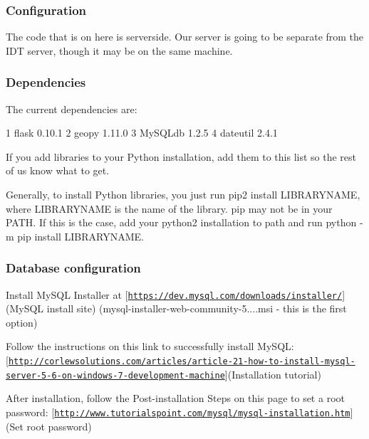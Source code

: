 \subsubsection*{Configuration}

The code that is on here is serverside. Our server is going to be separate from the I\+DT server, though it may be on the same machine.

\subsubsection*{Dependencies}

The current dependencies are\+:


\begin{DoxyCode}
1 flask 0.10.1
2 geopy 1.11.0
3 MySQLdb 1.2.5
4 dateutil 2.4.1
\end{DoxyCode}


If you add libraries to your Python installation, add them to this list so the rest of us know what to get.

Generally, to install Python libraries, you just run {\ttfamily pip2 install L\+I\+B\+R\+A\+R\+Y\+N\+A\+ME}, where {\ttfamily L\+I\+B\+R\+A\+R\+Y\+N\+A\+ME} is the name of the library. {\ttfamily pip} may not be in your {\ttfamily P\+A\+TH}. If this is the case, add your python2 installation to path and run {\ttfamily python -\/m pip install L\+I\+B\+R\+A\+R\+Y\+N\+A\+ME}.

\subsubsection*{Database configuration}

Install My\+S\+QL Installer at \mbox{[}\href{https://dev.mysql.com/downloads/installer/}{\tt https\+://dev.\+mysql.\+com/downloads/installer/}\mbox{]}(My\+S\+QL install site) (mysql-\/installer-\/web-\/community-\/5....\+msi -\/ this is the first option)

Follow the instructions on this link to successfully install My\+S\+QL\+: \mbox{[}\href{http://corlewsolutions.com/articles/article-21-how-to-install-mysql-server-5-6-on-windows-7-development-machine}{\tt http\+://corlewsolutions.\+com/articles/article-\/21-\/how-\/to-\/install-\/mysql-\/server-\/5-\/6-\/on-\/windows-\/7-\/development-\/machine}\mbox{]}(Installation tutorial)

After installation, follow the Post-\/installation Steps on this page to set a root password\+: \mbox{[}\href{http://www.tutorialspoint.com/mysql/mysql-installation.htm}{\tt http\+://www.\+tutorialspoint.\+com/mysql/mysql-\/installation.\+htm}\mbox{]}(Set root password)


